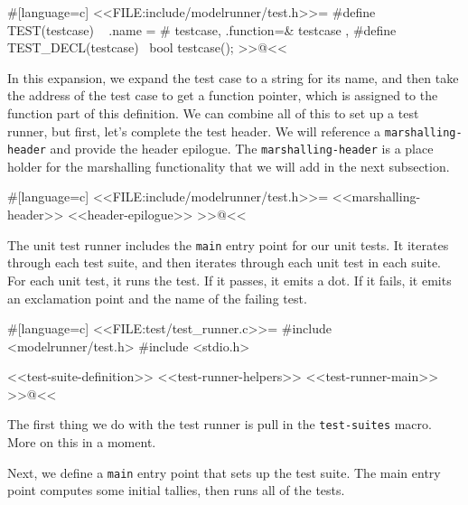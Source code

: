 #[language=c]
<<FILE:include/modelrunner/test.h>>=
#define TEST(testcase) \
    { .name = # testcase, .function=& testcase },
#define TEST_DECL(testcase) \
    bool testcase();
>>@<<

In this expansion, we expand the test case to a string for its name, and then
take the address of the test case to get a function pointer, which is assigned
to the function part of this definition. We can combine all of this to set up a
test runner, but first, let's complete the test header.  We will reference a
\verb/marshalling-header/ and provide the header epilogue.  The
\verb/marshalling-header/ is a place holder for the marshalling functionality
that we will add in the next subsection.

#[language=c]
<<FILE:include/modelrunner/test.h>>=
<<marshalling-header>>
<<header-epilogue>>
>>@<<

The unit test runner includes the \verb/main/ entry point for our unit tests. It
iterates through each test suite, and then iterates through each unit test in
each suite. For each unit test, it runs the test. If it passes, it emits a dot.
If it fails, it emits an exclamation point and the name of the failing test.

#[language=c]
<<FILE:test/test_runner.c>>=
#include <modelrunner/test.h>
#include <stdio.h>

<<test-suite-definition>>
<<test-runner-helpers>>
<<test-runner-main>>
>>@<<

The first thing we do with the test runner is pull in the \verb/test-suites/
macro.  More on this in a moment.

Next, we define a \verb/main/ entry point that sets up the test suite. The main
entry point computes some initial tallies, then runs all of the tests.

